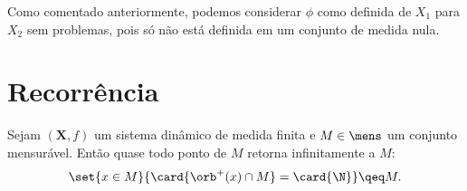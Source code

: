 
Como comentado anteriormente, podemos considerar $\phi$ como definida de $X_1$ para $X_2$ sem problemas, pois só não está definida em um conjunto de medida nula.

\section{Recorrência}

\begin{theorem}[Recorrência]
\label{teo:sd.poincare}
Sejam $(\bm X,f)$ um sistema dinâmico de medida finita e $M \in \mens$ um conjunto mensurável. Então quase todo ponto de $M$ retorna infinitamente a $M$:
	\begin{equation*}
	\set{x \in M}{\card{\orb^+(x) \cap M} = \card{\N}} \qeq M.
	\end{equation*}
\end{theorem}
